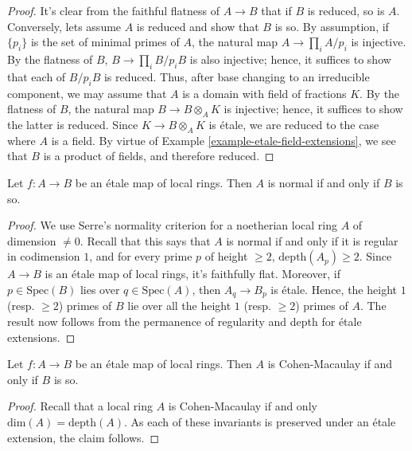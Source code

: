 \begin{proof}
It's clear from the faithful flatness of $A \to B$ that if $B$ is reduced, so
is $A$. Conversely, lets assume $A$ is reduced and show that $B$ is so. By
assumption, if $\{p_i\}$ is the set of minimal primes of $A$, the natural map
$A \to \prod_i A/p_i$ is injective. By the flatness of $B$,
$B \to \prod_i B/p_iB$ is also injective; hence, it suffices to show that each
of $B/p_iB$ is reduced. Thus, after base changing to an irreducible component,
we may assume that $A$ is a domain with field of fractions $K$. By the
flatness of $B$, the natural map $B \to B \otimes_A K$ is injective; hence,
it suffices to show the latter is reduced. Since $K \to B \otimes_A K$ is
\'etale, we are reduced to the case where $A$ is a field. By virtue of
Example \ref{example-etale-field-extensions}, we see that $B$ is a product of fields,
and therefore reduced.
\end{proof}


\begin{proposition}
\label{proposition-etale-normal}
Let $f:A \to B$ be an \'etale map of local rings. Then $A$ is normal if and
only if $B$ is so.
\end{proposition}

\begin{proof}
We use Serre's normality criterion for a noetherian local ring $A$ of
dimension $\neq 0$. Recall that this says that $A$ is normal if and only if
it is regular in codimension $1$, and for every prime $p$ of height $\geq 2$,
$\mathrm{depth}(A_p) \geq 2$. Since $A \to B$ is an \'etale map of local
rings, it's faithfully flat. Moreover, if $p \in \text{Spec}(B)$ lies over
$q \in \text{Spec}(A)$, then $A_q \to B_p$ is \'etale. Hence, the height $1$
(resp. $\geq 2$) primes of $B$ lie over all the height $1$ (resp. $\geq 2$)
primes of $A$. The result now follows from the permanence of regularity and
depth for \'etale extensions.
\end{proof}

\begin{proposition}
\label{proposition-etale-CM}
Let $f:A \to B$ be an \'etale map of local rings. Then $A$ is Cohen-Macaulay
if and only if $B$ is so.
\end{proposition}
\begin{proof}
Recall that a local ring $A$ is Cohen-Macaulay if and only
$\mathrm{dim}(A) = \mathrm{depth}(A)$. As each of these invariants is
preserved under an \'etale extension, the claim follows.
\end{proof}

